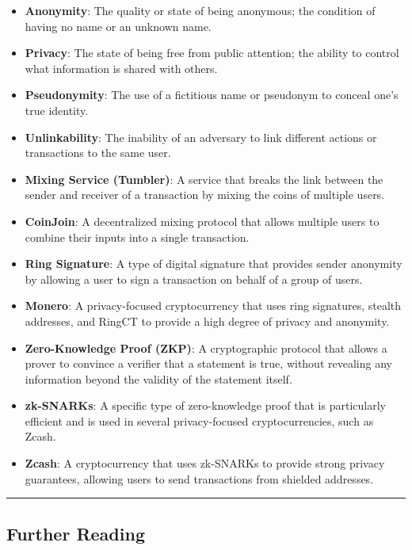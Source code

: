 \begin{itemize}
\tightlist
\item
  \textbf{Anonymity}: The quality or state of being anonymous; the
  condition of having no name or an unknown name.
\item
  \textbf{Privacy}: The state of being free from public attention; the
  ability to control what information is shared with others.
\item
  \textbf{Pseudonymity}: The use of a fictitious name or pseudonym to
  conceal one's true identity.
\item
  \textbf{Unlinkability}: The inability of an adversary to link
  different actions or transactions to the same user.
\item
  \textbf{Mixing Service (Tumbler)}: A service that breaks the link
  between the sender and receiver of a transaction by mixing the coins
  of multiple users.
\item
  \textbf{CoinJoin}: A decentralized mixing protocol that allows
  multiple users to combine their inputs into a single transaction.
\item
  \textbf{Ring Signature}: A type of digital signature that provides
  sender anonymity by allowing a user to sign a transaction on behalf of
  a group of users.
\item
  \textbf{Monero}: A privacy-focused cryptocurrency that uses ring
  signatures, stealth addresses, and RingCT to provide a high degree of
  privacy and anonymity.
\item
  \textbf{Zero-Knowledge Proof (ZKP)}: A cryptographic protocol that
  allows a prover to convince a verifier that a statement is true,
  without revealing any information beyond the validity of the statement
  itself.
\item
  \textbf{zk-SNARKs}: A specific type of zero-knowledge proof that is
  particularly efficient and is used in several privacy-focused
  cryptocurrencies, such as Zcash.
\item
  \textbf{Zcash}: A cryptocurrency that uses zk-SNARKs to provide strong
  privacy guarantees, allowing users to send transactions from shielded
  addresses.
\end{itemize}

\begin{center}\rule{0.5\linewidth}{0.5pt}\end{center}

\subsection{Further Reading}\label{further-reading}

